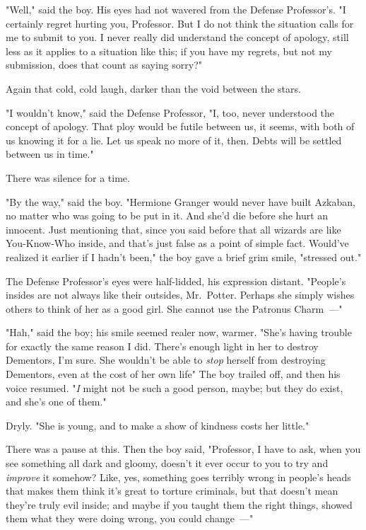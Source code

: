 "Well," said the boy. His eyes had not wavered from the Defense Professor's. "I
certainly regret hurting you, Professor. But I do not think the situation calls
for me to submit to you. I never really did understand the concept of apology,
still less as it applies to a situation like this; if you have my regrets, but
not my submission, does that count as saying sorry?"

Again that cold, cold laugh, darker than the void between the stars.

"I wouldn't know," said the Defense Professor, "I, too, never understood the
concept of apology. That ploy would be futile between us, it seems, with both
of us knowing it for a lie. Let us speak no more of it, then. Debts will be
settled between us in time."

There was silence for a time.

"By the way," said the boy. "Hermione Granger would never have built Azkaban,
no matter who was going to be put in it. And she'd die before she hurt an
innocent. Just mentioning that, since you said before that all wizards are like
You-Know-Who inside, and that's just false as a point of simple fact. Would've
realized it earlier if I hadn't been," the boy gave a brief grim smile,
"stressed out."

The Defense Professor's eyes were half-lidded, his expression distant.
"People's insides are not always like their outsides, Mr.~Potter. Perhaps she
simply wishes others to think of her as a good girl. She cannot use the
Patronus Charm~---"

"Hah," said the boy; his smile seemed realer now, warmer. "She's having trouble
for exactly the same reason I did. There's enough light in her to destroy
Dementors, I'm sure. She wouldn't be able to \emph{stop} herself from
destroying Dementors, even at the cost of her own life{\el}" The boy trailed
off, and then his voice resumed. "\emph{I} might not be such a good person,
maybe; but they do exist, and she's one of them."

Dryly. "She is young, and to make a show of kindness costs her little."

There was a pause at this. Then the boy said, "Professor, I have to ask, when
you see something all dark and gloomy, doesn't it ever occur to you to try and
\emph{improve} it somehow? Like, yes, something goes terribly wrong in people's
heads that makes them think it's great to torture criminals, but that doesn't
mean they're truly evil inside; and maybe if you taught them the right things,
showed them what they were doing wrong, you could change~---"

